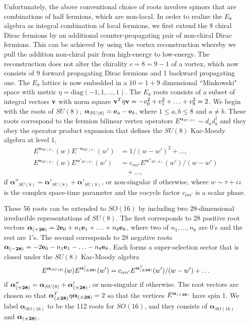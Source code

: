 Unfortunately, the above conventional choice of roots involves spinors that are combinations of half fermions, which are non-local. In order to realize the $E_8$ algebra as integral combination of local fermions, we first extend the 8 chiral Dirac fermions by an additional counter-propagating pair of non-chiral Dirac fermions. This can be achieved by using the vortex reconstruction whereby we pull the addition non-chiral pair from high-energy to low-energy. The reconstruction does not alter the chirality $c=8=9-1$ of a vortex, which now consists of 9 forward propagating Dirac fermions and 1 backward propagating one. The $E_8$ lattice is now embedded in a $10=1+9$ dimensional ``Minkowski" space with metric $\eta=\mathrm{diag}(-1,1,\ldots,1)$. The $E_8$ roots consists of a subset of integral vectors ${\bf v}$ with norm square ${\bf v}^T\eta{\bf v}=-v_0^2+v_1^2+\ldots+v_9^2=2$. We begin with the roots of $SU(8)$, $\boldsymbol\alpha_{SU(8)}={\bf e}_a-{\bf e}_b$, where $1\leq a,b\leq8$ and $a\neq b$. These roots correspond to the fermion bilinear vertex operators $E^{\boldsymbol\alpha_{SU(8)}}\sim d_ad_b^\dagger$ and they obey the operator product expansion that defines the $SU(8)$ Kac-Moody algebra at level 1, \begin{align}E^{\boldsymbol\alpha_{SU(8)}}(w)E^{-\boldsymbol\alpha_{SU(8)}}(w')&=1/(w-w')^2+\ldots,\nonumber\\E^{\boldsymbol\alpha_{SU(8)}}(w)E^{\boldsymbol\alpha'_{SU(8)}}(w')&=c_{\alpha\alpha'}E^{\boldsymbol\alpha''_{SU(8)}}(w')/(w-w')\nonumber\\&\;\;\;+\ldots,\end{align} if $\boldsymbol\alpha''_{SU(8)}=\boldsymbol\alpha'_{SU(8)}+\boldsymbol\alpha'_{SU(8)}$, or non-singular if otherwise, where $w\sim\tau+iz$ is the complex space-time parameter and the cocycle factor $c_{\alpha\alpha'}$ is a scalar phase.



These 56 roots can be extended to $SO(16)$ by including two 28-dimensional irreducible representations of $SU(8)$. The first corresponds to 28 positive root vectors $\boldsymbol\alpha_{(+{\bf 28})}=2{\bf e}_0+n_1{\bf e}_1+\ldots+n_8{\bf e}_8$, where two of $n_1,\ldots,n_8$ are 0's and the rest are 1's. The second corresponds to 28 negative roots $\boldsymbol\alpha_{(-{\bf 28})}=-2{\bf e}_0-n_1{\bf e}_1-\ldots-n_8{\bf e}_8$. Each forms a super-selection sector that is closed under the $SU(8)$ Kac-Moody algebra \begin{align}E^{\boldsymbol\alpha_{SU(8)}}(w)E^{\boldsymbol\alpha'_{(\pm{\bf 28})}}(w')=c_{\alpha\alpha'}E^{\boldsymbol\alpha''_{(\pm{\bf 28})}}(w')/(w-w')+\ldots\end{align} if $\boldsymbol\alpha''_{(\pm{\bf 28})}=\boldsymbol\alpha_{SU(8)}+\boldsymbol\alpha'_{(\pm{\bf 28})}$, or non-singular if otherwise. The root vectors are chosen so that $\boldsymbol\alpha_{(\pm{\bf28})}^T\eta\boldsymbol\alpha_{(\pm{\bf28})}=2$ so that the vertices $E^{\boldsymbol\alpha_{(\pm{\bf28})}}$ have spin 1. We label $\boldsymbol\alpha_{SO(16)}$ to be the 112 roots for $SO(16)$, and they consists of $\boldsymbol\alpha_{SO(16)}$ and $\boldsymbol\alpha_{(\pm{\bf28})}$.

